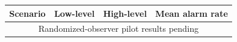 \begin{tabular}{lccc}
\toprule
Scenario & Low-level & High-level & Mean alarm rate \\
\midrule
\multicolumn{4}{c}{Randomized-observer pilot results pending} \\
\bottomrule
\end{tabular}
